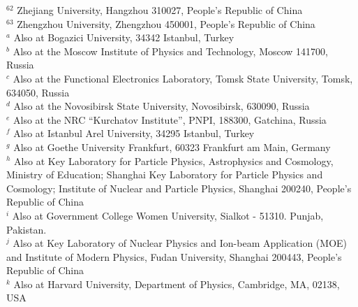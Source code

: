 \begin{small}
\begin{center}
{$^{62}$ Zhejiang University, Hangzhou 310027, People's Republic of China\\
$^{63}$ Zhengzhou University, Zhengzhou 450001, People's Republic of China\\
\vspace{0.2cm}
$^{a}$ Also at Bogazici University, 34342 Istanbul, Turkey\\
$^{b}$ Also at the Moscow Institute of Physics and Technology, Moscow 141700, Russia\\
$^{c}$ Also at the Functional Electronics Laboratory, Tomsk State University, Tomsk, 634050, Russia\\
$^{d}$ Also at the Novosibirsk State University, Novosibirsk, 630090, Russia\\
$^{e}$ Also at the NRC ``Kurchatov Institute'', PNPI, 188300, Gatchina, Russia\\
$^{f}$ Also at Istanbul Arel University, 34295 Istanbul, Turkey\\
$^{g}$ Also at Goethe University Frankfurt, 60323 Frankfurt am Main, Germany\\
$^{h}$ Also at Key Laboratory for Particle Physics, Astrophysics and Cosmology, Ministry of Education; Shanghai Key Laboratory for Particle Physics and Cosmology; Institute of Nuclear and Particle Physics, Shanghai 200240, People's Republic of China\\
$^{i}$ Also at Government College Women University, Sialkot - 51310. Punjab, Pakistan. \\
$^{j}$ Also at Key Laboratory of Nuclear Physics and Ion-beam Application (MOE) and Institute of Modern Physics, Fudan University, Shanghai 200443, People's Republic of China\\
$^{k}$ Also at Harvard University, Department of Physics, Cambridge, MA, 02138, USA\\
}\end{center}

\vspace{0.4cm}
\end{small}

